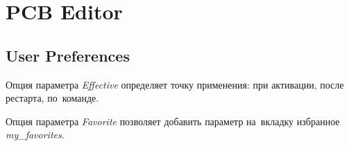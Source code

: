\section{PCB Editor} \label{sec:pcb_editor}



\subsection{User Preferences} \label{ssec:user_preferences}

Опция параметра \textit{Effective} определяет точку применения: при активации, после рестарта, по~команде.

Опция параметра \textit{Favorite} позволяет добавить параметр на~вкладку избранное \textit{my\_favorites}.



